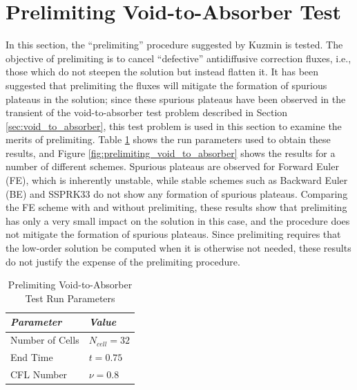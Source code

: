 \section{Prelimiting Void-to-Absorber Test}
\label{sec:prelimiting_void_to_absorber}

In this section, the ``prelimiting'' procedure suggested by Kuzmin
\cite{kuzmin_FCT} is tested. The objective of prelimiting is to
cancel ``defective'' antidiffusive correction fluxes, i.e., those
which do not steepen the solution but instead flatten it. It
has been suggested that prelimiting the fluxes will mitigate
the formation of spurious plateaus in the solution; since these
spurious plateaus have been observed in the transient of the
void-to-absorber test problem described in Section \ref{sec:void_to_absorber},
this test problem is used in this section to examine the merits
of prelimiting.
Table \ref{tab:prelimiting_void_to_absorber_run_parameters}
shows the run parameters used to obtain these results, and Figure
\ref{fig:prelimiting_void_to_absorber} shows the results
for a number of different schemes. Spurious plateaus are observed
for Forward Euler (FE), which is inherently unstable, while
stable schemes such as Backward Euler (BE) and SSPRK33 do not
show any formation of spurious plateaus. Comparing the FE
scheme with and without prelimiting, these results show that
prelimiting has only a very small impact on the solution in this
case, and the procedure does not mitigate the formation of
spurious plateaus. Since prelimiting requires that the
low-order solution be computed when it is otherwise not needed,
these results do not justify the expense of the prelimiting
procedure.
\begin{table}[h]\caption{Prelimiting Void-to-Absorber Test Run Parameters}
\label{tab:prelimiting_void_to_absorber_run_parameters}
\centering
\begin{tabular}{l l}\toprule
\emph{Parameter} & \emph{Value}\\\midrule
Number of Cells & $N_{cell} = 32$\\
End Time & $t = 0.75$\\
CFL Number & $\nu = 0.8$\\
\bottomrule\end{tabular}
\end{table}
